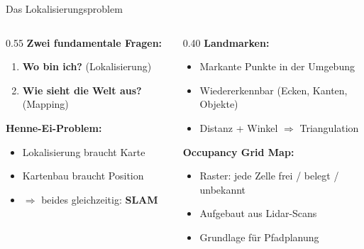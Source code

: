 \documentclass[%
  aspectratio=169,
  10pt
]{beamer}
\newcommand{\hl}[1]{{\color{fbblau}\textbf{#1}}}
\begin{document}
\begin{frame}{Das Lokalisierungsproblem}

\begin{columns}[T]
  \begin{column}{0.55\textwidth}
    \textbf{Zwei fundamentale Fragen:}
    \begin{enumerate}
      \item \hl{Wo bin ich?} (Lokalisierung)
      \item \hl{Wie sieht die Welt aus?} (Mapping)
    \end{enumerate}

    \vspace{3mm}
    \textbf{Henne-Ei-Problem:}
    \begin{itemize}
      \item Lokalisierung braucht Karte
      \item Kartenbau braucht Position
      \item $\Rightarrow$ beides gleichzeitig: \textbf{SLAM}
    \end{itemize}
  \end{column}
  \begin{column}{0.40\textwidth}
    \textbf{Landmarken:}
    \begin{itemize}
      \item Markante Punkte in der Umgebung
      \item Wiedererkennbar (Ecken, Kanten, Objekte)
      \item Distanz + Winkel $\Rightarrow$ Triangulation
    \end{itemize}
    \vspace{2mm}
    \textbf{Occupancy Grid Map:}
    \begin{itemize}
      \item Raster: jede Zelle frei / belegt / unbekannt
      \item Aufgebaut aus Lidar-Scans
      \item Grundlage für Pfadplanung
    \end{itemize}
  \end{column}
\end{columns}

\end{frame}
\end{document}
